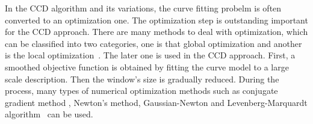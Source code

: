 In the CCD algorithm and its variations, the curve fitting probelm is
often converted to an optimization one. The optimization step is
outstanding important for the CCD approach. There are many methods to
deal with optimization, which can be classified into two
categories, one is that global optimization and another is the local
optimization~\cite{hanek2004fitting}. The later one is used in the CCD
approach. First, a smoothed objective function is obtained by fitting
the curve model to a large scale description. Then the window's size is
gradually reduced. During the process, many types of  numerical
optimization  methods such as  conjugate gradient method , Newton's
method, Gaussian-Newton and Levenberg-Marquardt algorithm~\cite{contourpanin2011} can be used.


